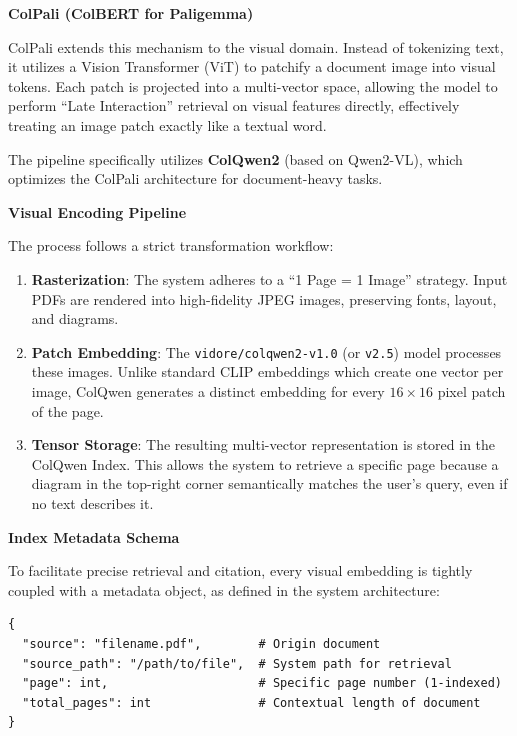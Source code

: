 \textbf{ColPali (ColBERT for Paligemma)}

ColPali extends this mechanism to the visual domain. Instead of tokenizing text, it utilizes a Vision Transformer (ViT) to patchify a document image into visual tokens. Each patch is projected into a multi-vector space, allowing the model to perform ``Late Interaction'' retrieval on visual features directly, effectively treating an image patch exactly like a textual word.

The pipeline specifically utilizes \textbf{ColQwen2} (based on Qwen2-VL), which optimizes the ColPali architecture for document-heavy tasks.

\textbf{Visual Encoding Pipeline}

The process follows a strict transformation workflow:

\begin{enumerate}
    \item \textbf{Rasterization}: The system adheres to a ``1 Page = 1 Image'' strategy. Input PDFs are rendered into high-fidelity JPEG images, preserving fonts, layout, and diagrams.
    \item \textbf{Patch Embedding}: The \texttt{vidore/colqwen2-v1.0} (or \texttt{v2.5}) model processes these images. Unlike standard CLIP embeddings which create one vector per image, ColQwen generates a distinct embedding for every $16 \times 16$ pixel patch of the page.
    \item \textbf{Tensor Storage}: The resulting multi-vector representation is stored in the ColQwen Index. This allows the system to retrieve a specific page because a diagram in the top-right corner semantically matches the user's query, even if no text describes it.
\end{enumerate}

\textbf{Index Metadata Schema}

To facilitate precise retrieval and citation, every visual embedding is tightly coupled with a metadata object, as defined in the system architecture:
\begin{verbatim}
{
  "source": "filename.pdf",        # Origin document
  "source_path": "/path/to/file",  # System path for retrieval
  "page": int,                     # Specific page number (1-indexed)
  "total_pages": int               # Contextual length of document
}
\end{verbatim}

